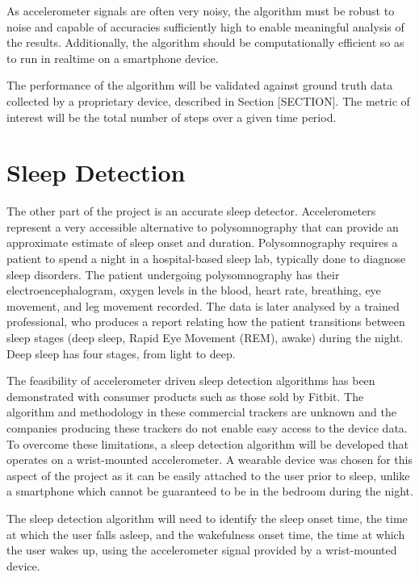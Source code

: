             As accelerometer signals are often very noisy, the algorithm must be robust to noise and capable of accuracies sufficiently high to enable meaningful analysis of the results. Additionally, the algorithm should be computationally efficient so as to run in realtime on a smartphone device.

            The performance of the algorithm will be validated against ground truth data collected by a proprietary device, described in Section [SECTION]. The metric of interest will be the total number of steps over a given time period.

        \section{Sleep Detection}

            The other part of the project is an accurate sleep detector. Accelerometers represent a very accessible alternative to polysomnography that can provide an approximate estimate of sleep onset and duration. Polysomnography requires a patient to spend a night in a hospital-based sleep lab, typically done to diagnose sleep disorders. The patient undergoing polysomnography has their electroencephalogram, oxygen levels in the blood, heart rate, breathing, eye movement, and leg movement recorded. The data is later analysed by a trained professional, who produces a report relating how the patient transitions between sleep stages (deep sleep, Rapid Eye Movement (REM), awake) during the night. Deep sleep has four stages, from light to deep.

            The feasibility of accelerometer driven sleep detection algorithms has been demonstrated with consumer products such as those sold by Fitbit. The algorithm and methodology in these commercial trackers are unknown and the companies producing these trackers do not enable easy access to the device data. To overcome these limitations, a sleep detection algorithm will be developed that operates on a wrist-mounted accelerometer. A wearable device was chosen for this aspect of the project as it can be easily attached to the user prior to sleep, unlike a smartphone which cannot be guaranteed to be in the bedroom during the night.

            The sleep detection algorithm will need to identify the sleep onset time, the time at which the user falls asleep, and the wakefulness onset time, the time at which the user wakes up, using the accelerometer signal provided by a wrist-mounted device.

